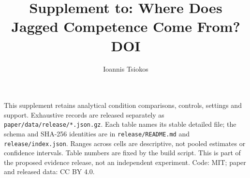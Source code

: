 \documentclass[11pt]{article}
\title{Supplement to: Where Does Jagged Competence Come From?\\DOI \paperdoi}
\author{Ioannis Tsiokos}
\date{\manuscriptdate\quad\manuscriptversion}
\begin{document}
\maketitle
\noindent This supplement retains analytical condition comparisons, controls,
settings and support. Exhaustive records are released separately as
\texttt{paper/data/release/*.json.gz}. Each table names its stable detailed file;
the schema and SHA-256 identities are in \texttt{release/README.md} and
\texttt{release/index.json}. Ranges across cells are descriptive, not pooled
estimates or confidence intervals. Table numbers are fixed by the build script.
This is part of the proposed evidence release, not an independent experiment.
Code: MIT; paper and released data: CC BY 4.0.

\clearpage









\end{document}
